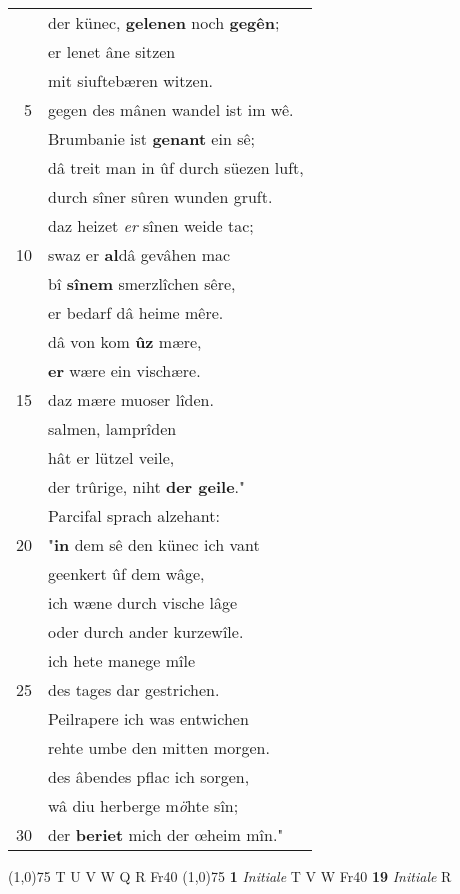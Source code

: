 \documentclass[8pt,a4paper,notitlepage]{article}
\begin{document}
\begin{table}[ht]
\begin{minipage}[t]{0.5\linewidth}
\begin{tabular}{rl}
 & der künec, \textbf{gelenen} noch \textbf{gegên};\\ 
 & er lenet âne sitzen\\ 
 & mit siuftebæren witzen.\\ 
5 & gegen des mânen wandel ist im wê.\\ 
 & Brumbanie ist \textbf{genant} ein sê;\\ 
 & dâ treit man in ûf durch süezen luft,\\ 
 & durch sîner sûren wunden gruft.\\ 
 & daz heizet \textit{er} sînen weide tac;\\ 
10 & swaz er \textbf{al}dâ gevâhen mac\\ 
 & bî \textbf{sînem} smerzlîchen sêre,\\ 
 & er bedarf dâ heime mêre.\\ 
 & dâ von kom \textbf{ûz} mære,\\ 
 & \textbf{er} wære ein vischære.\\ 
15 & daz mære muoser lîden.\\ 
 & salmen, lamprîden\\ 
 & hât er lützel veile,\\ 
 & der trûrige, niht \textbf{der geile}."\\ 
 & Parcifal sprach alzehant:\\ 
20 & "\textbf{in} dem sê den künec ich vant\\ 
 & geenkert ûf dem wâge,\\ 
 & ich wæne durch vische lâge\\ 
 & oder durch ander kurzewîle.\\ 
 & ich hete manege mîle\\ 
25 & des tages dar gestrichen.\\ 
 & Peilrapere ich was entwichen\\ 
 & rehte umbe den mitten morgen.\\ 
 & des âbendes pflac ich sorgen,\\ 
 & wâ diu herberge m\textit{ö}hte sîn;\\ 
30 & der \textbf{beriet} mich der œheim mîn."\\ 
\end{tabular}
\scriptsize
\line(1,0){75} \newline
T U V W Q R Fr40 \newline
\line(1,0){75} \newline
\textbf{1} \textit{Initiale} T V W Fr40  \textbf{19} \textit{Initiale} R  \newline

\end{minipage}
\end{table}
\end{document}
